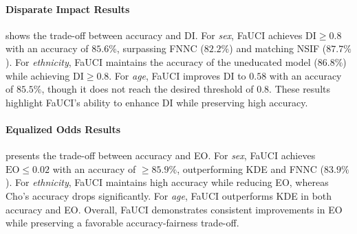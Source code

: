 %
\paragraph{Disparate Impact Results}
%
 shows the trade-off between accuracy and \gls{DI}.
%
For \emph{sex}, \gls{FaUCI} achieves \(\text{DI} \geq 0.8\) with an accuracy of \(85.6\%\), surpassing \gls{FNNC} (\(82.2\%\)) and matching \gls{NSIF} (\(87.7\%\)).
%
For \emph{ethnicity}, \gls{FaUCI} maintains the accuracy of the uneducated model (\(86.8\%\)) while achieving \(\text{DI} \geq 0.8\).
%
For \emph{age}, \gls{FaUCI} improves \(\text{DI}\) to \(0.58\) with an accuracy of \(85.5\%\), though it does not reach the desired threshold of \(0.8\).
%
These results highlight \gls{FaUCI}'s ability to enhance \gls{DI} while preserving high accuracy.

%
\paragraph{Equalized Odds Results}
%
 presents the trade-off between accuracy and \gls{EO}.
%
For \emph{sex}, \gls{FaUCI} achieves \(\text{EO} \leq 0.02\) with an accuracy of \(\geq 85.9\%\), outperforming \gls{KDE} and \gls{FNNC} (\(83.9\%\)).
%
For \emph{ethnicity}, \gls{FaUCI} maintains high accuracy while reducing \gls{EO}, whereas Cho's accuracy drops significantly.
%
For \emph{age}, \gls{FaUCI} outperforms \gls{KDE} in both accuracy and \gls{EO}.
%
Overall, \gls{FaUCI} demonstrates consistent improvements in \gls{EO} while preserving a favorable accuracy-fairness trade-off.
